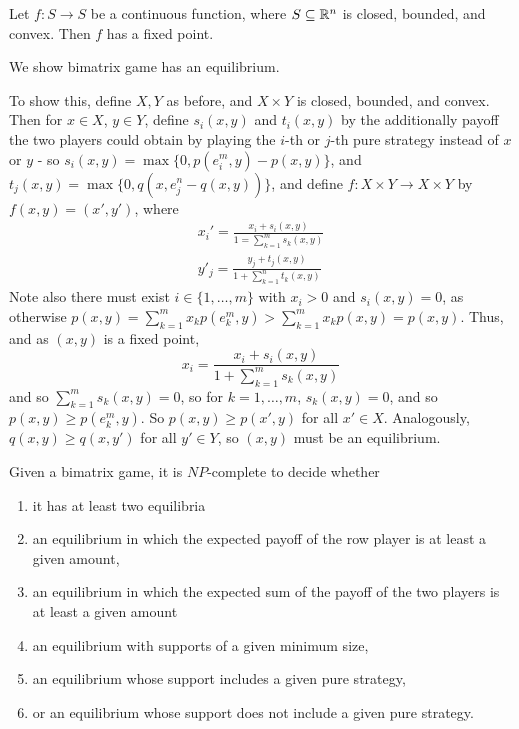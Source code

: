 \begin{thm}
  \label{sec:strat-equil-5}
  Let $f: S \rightarrow S$ be a continuous function, where $S
  \subseteq \mathbb{R}^{n}$ is closed, bounded, and convex. Then $f$ has a
  fixed point.
\end{thm}

\begin{thm}
  \label{sec:strat-equil-4}
  We show bimatrix game has an equilibrium.   

  To show this, define $X, Y$ as before, and $X \times Y$ is closed,
  bounded, and convex.  Then for $x \in X$, $y \in Y$, define
  $s_{i}(x, y)$ and $t_{i} (x, y)$ by the additionally payoff the two
  players could obtain by playing the $i$-th or $j$-th pure strategy
  instead of $x$ or $y$ - so $s_{i}(x, y) = \max \{ 0, p(e_{i}^{m}, y)
- p(x, y) \} $, and $t_{j}(x, y) = \max \{ 0, q(x, e_{j}^{n} - q(x,
y)) \}$, and define $f: X \times Y \rightarrow X \times Y$ by $f(x, y)
= (x', y')$, where
\begin{align}
  \label{eq:18}
  x_{i}' = \frac{x_{i} + s_{i}(x, y)}{1 = \sum_{k=1}^{m} s_{k}(x, y)}
\\
y'_{j} = \frac{y_{j} + t_{j}(x, y)}{1 + \sum_{k=1}^{n} t_{k}(x, y)}
\end{align}
Note also there must exist $i \in \{ 1, \dots, m \} $ with $x_{i} > 0$
and $s_{i}(x, y) = 0$, as otherwise $p(x, y) = \sum_{k=1}^{m} x_{k}
p(e_{k}^{m}, y) > \sum_{k=1}^{m} x_{k} p(x, y) = p(x, y)$.  Thus, and
as $(x, y)$ is a fixed point,
\begin{equation}
  \label{eq:19}
  x_{i} = \frac{x_{i} + s_{i}(x, y)}{1 + \sum_{k=1}^{m} s_{k}(x, y)}
\end{equation}
and so $\sum_{k=1}^{m} s_{k}(x, y) = 0$, so for $k = 1, \dots, m$,
$s_{k}(x, y) = 0$, and so $p(x, y) \geq p(e_{k}^{m}, y)$. So $p(x, y)
\geq p(x', y)$ for all $x' \in X$.  Analogously, $q(x, y) \geq q(x,
y')$ for all $y' \in Y$, so $(x, y)$ must be an equilibrium.
\end{thm}

\begin{thm}
  \label{sec:strat-equil-6}
  Given a bimatrix game, it is $NP$-complete to decide whether
  \begin{enumerate}
  \item it has at least two equilibria
  \item an equilibrium in which the expected payoff of the row player
    is at least a given amount,
  \item an equilibrium in which the expected sum of the payoff of the
    two players is at least a given amount
  \item an equilibrium with supports of a given minimum size,
  \item an equilibrium whose support includes a given pure strategy,
  \item or an equilibrium whose support does not include a given pure
    strategy.
  \end{enumerate}
\end{thm}

